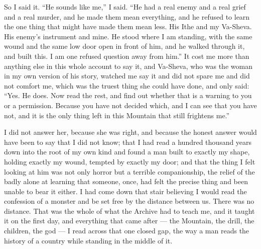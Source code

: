 So I said it. ``He sounds like me,'' I said. ``He had a real enemy and a real grief and a real murder, and he made them mean everything, and he refused to learn the one thing that might have made them mean less. His Ithe and my Va-Sheva. His enemy's instrument and mine. He stood where I am standing, with the same wound and the same low door open in front of him, and he walked through it, and built this. I am one refused question away from him.'' It cost me more than anything else in this whole account to say it, and Va-Sheva, who was the woman in my own version of his story, watched me say it and did not spare me and did not comfort me, which was the truest thing she could have done, and only said: ``Yes. He does. Now read the rest, and find out whether that is a warning to you or a permission. Because you have not decided which, and I can see that you have not, and it is the only thing left in this Mountain that still frightens me.''\par

I did not answer her, because she was right, and because the honest answer would have been to say that I did not know; that I had read a hundred thousand years down into the root of my own kind and found a man built to exactly my shape, holding exactly my wound, tempted by exactly my door; and that the thing I felt looking at him was not only horror but a terrible companionship, the relief of the badly alone at learning that someone, once, had felt the precise thing and been unable to bear it either. I had come down that stair believing I would read the confession of a monster and be set free by the distance between us. There was no distance. That was the whole of what the Archive had to teach me, and it taught it on the first day, and everything that came after --- the Mountain, the drill, the children, the god --- I read across that one closed gap, the way a man reads the history of a country while standing in the middle of it.\par

\ornament
